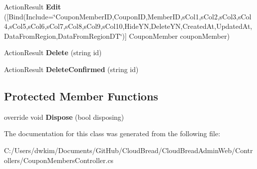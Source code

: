 \begin{DoxyCompactItemize}
\item 
Action\+Result {\bfseries Edit} (\mbox{[}Bind(Include=\char`\"{}Coupon\+Member\+ID,Coupon\+ID,Member\+ID,s\+Col1,s\+Col2,s\+Col3,s\+Col4,s\+Col5,s\+Col6,s\+Col7,s\+Col8,s\+Col9,s\+Col10,Hide\+YN,Delete\+YN,Created\+At,Updated\+At,Data\+From\+Region,Data\+From\+Region\+DT\char`\"{})\mbox{]} Coupon\+Member coupon\+Member)\hypertarget{a00070_a9372b4773c6a02aa4bc8789735092d22}{}\label{a00070_a9372b4773c6a02aa4bc8789735092d22}

\item 
Action\+Result {\bfseries Delete} (string id)\hypertarget{a00070_ae64ce9b82684a7a0dca6cf7dd399cc82}{}\label{a00070_ae64ce9b82684a7a0dca6cf7dd399cc82}

\item 
Action\+Result {\bfseries Delete\+Confirmed} (string id)\hypertarget{a00070_aa9257c01f6326837ad8a18e5886dd3bd}{}\label{a00070_aa9257c01f6326837ad8a18e5886dd3bd}

\end{DoxyCompactItemize}
\subsection*{Protected Member Functions}
\begin{DoxyCompactItemize}
\item 
override void {\bfseries Dispose} (bool disposing)\hypertarget{a00070_aa107d2fb5d89ed39805e30d9736314d4}{}\label{a00070_aa107d2fb5d89ed39805e30d9736314d4}

\end{DoxyCompactItemize}


The documentation for this class was generated from the following file\+:\begin{DoxyCompactItemize}
\item 
C\+:/\+Users/dwkim/\+Documents/\+Git\+Hub/\+Cloud\+Bread/\+Cloud\+Bread\+Admin\+Web/\+Controllers/Coupon\+Members\+Controller.\+cs\end{DoxyCompactItemize}

